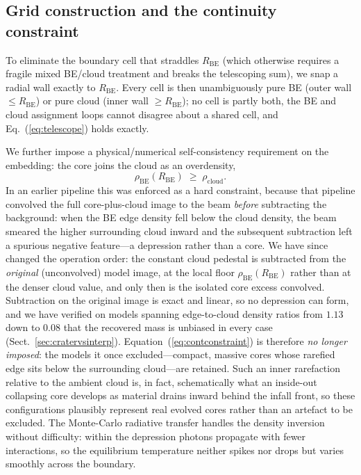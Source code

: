 \documentclass[11pt,a4paper]{article}
\newcommand{\Rbe}{R_{\mathrm{BE}}}
\newcommand{\rhocloud}{\rho_{\mathrm{cloud}}}
\begin{document}
\subsection{Grid construction and the continuity constraint}
\label{sec:continuity}

To eliminate the boundary cell that straddles $\Rbe$ (which otherwise
requires a fragile mixed BE/cloud treatment and breaks the telescoping
sum), we snap a radial wall exactly to $\Rbe$. Every cell is then
unambiguously pure BE (outer wall $\le \Rbe$) or pure cloud
(inner wall $\ge \Rbe$); no cell is partly both, the BE and cloud
assignment loops cannot disagree about a shared cell, and
Eq.~(\ref{eq:telescope}) holds exactly.

We further impose a physical/numerical self-consistency requirement on the
embedding: the core joins the cloud as an overdensity,
\begin{equation}
  \rho_{\mathrm{BE}}(\Rbe)\;\ge\;\rhocloud .
  \label{eq:contconstraint}
\end{equation}
In an earlier pipeline this was enforced as a hard constraint, because that
pipeline convolved the full core-plus-cloud image to the beam \emph{before}
subtracting the background: when the BE edge density fell below the cloud
density, the beam smeared the higher surrounding cloud inward and the
subsequent subtraction left a spurious negative feature---a depression rather
than a core. We have since changed the operation order: the constant cloud
pedestal is subtracted from the \emph{original} (unconvolved) model image, at
the local floor $\rho_{\mathrm{BE}}(\Rbe)$ rather than at the denser cloud
value, and only then is the isolated core excess convolved. Subtraction on the
original image is exact and linear, so no depression can form, and we have
verified on models spanning edge-to-cloud density ratios from $1.13$ down to
$0.08$ that the recovered mass is unbiased in every case
(Sect.~\ref{sec:cratervsinterp}). Equation~(\ref{eq:contconstraint}) is
therefore \emph{no longer imposed}: the models it once excluded---compact,
massive cores whose rarefied edge sits below the surrounding cloud---are
retained. Such an inner rarefaction relative to the ambient cloud is, in fact,
schematically what an inside-out collapsing core develops as material drains
inward behind the infall front, so these configurations plausibly represent
real evolved cores rather than an artefact to be excluded. The Monte-Carlo
radiative transfer handles the density inversion without difficulty: within
the depression photons propagate with fewer interactions, so the equilibrium
temperature neither spikes nor drops but varies smoothly across the boundary.
\end{document}
